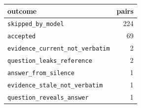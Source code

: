\begin{tabular}{lr}
\toprule
outcome & pairs \\
\midrule
\texttt{skipped\_by\_model} & 224 \\
\texttt{accepted} & 69 \\
\texttt{evidence\_current\_not\_verbatim} & 2 \\
\texttt{question\_leaks\_reference} & 2 \\
\texttt{answer\_from\_silence} & 1 \\
\texttt{evidence\_stale\_not\_verbatim} & 1 \\
\texttt{question\_reveals\_answer} & 1 \\
\bottomrule
\end{tabular}
